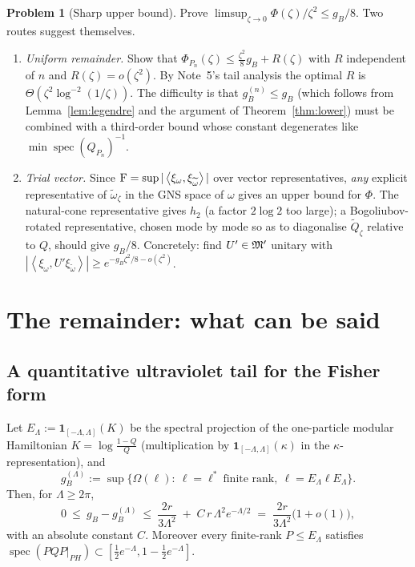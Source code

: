 \documentclass[11pt]{article}
\newcommand{\ip}[2]{\left\langle #1,#2\right\rangle}
\newcommand{\one}{\mathbf 1}
\newcommand{\Qt}{\widetilde Q}
\theoremstyle{definition}\newtheorem{problem}[theorem]{Problem}
\begin{document}
\begin{problem}[Sharp upper bound]\label{prob:sharp}
Prove \(\limsup_{\zeta\to0}\Phi(\zeta)/\zeta^2\le g_B/8\).  Two routes suggest themselves.
\begin{enumerate}[label=(\alph*),leftmargin=2em]
\item \emph{Uniform remainder.}  Show that
\(\Phi_{P_n}(\zeta)\le\frac{\zeta^2}8g_B+R(\zeta)\) with \(R\) independent of \(n\) and
\(R(\zeta)=o(\zeta^2)\).  By Note~5's tail analysis the optimal \(R\) is
\(\Theta(\zeta^2\log^{-2}(1/\zeta))\).  The difficulty is that \(g_B^{(n)}\le g_B\) (which follows
from Lemma~\ref{lem:legendre} and the argument of Theorem~\ref{thm:lower}) must be combined with a
third-order bound whose constant degenerates like \(\min\operatorname{spec}(Q_{P_n})^{-1}\).
\item \emph{Trial vector.}  Since \(\Fid=\sup|\ip{\xi_\omega}{\xi_{\widetilde\omega}}|\) over vector
representatives, \emph{any} explicit representative of \(\widetilde\omega_\zeta\) in the GNS space of
\(\omega\) gives an upper bound for \(\Phi\).  The natural-cone representative gives \(h_2\)
(a factor \(2\log2\) too large); a Bogoliubov-rotated representative, chosen mode by mode so as to
diagonalise \(\Qt_\zeta\) relative to \(Q\), should give \(g_B/8\).  Concretely: find
\(U'\in\mathfrak M'\) unitary with \(|\ip{\xi_\omega}{U'\xi_{\widetilde\omega}}|\ge e^{-g_B\zeta^2/8-o(\zeta^2)}\).
\end{enumerate}
\end{problem}

\section{The remainder: what can be said}\label{sec:remainder}

\subsection{A quantitative ultraviolet tail for the Fisher form}

\begin{proposition}\label{prop:tailgB}
Let \(E_\Lambda:=\one_{[-\Lambda,\Lambda]}(K)\) be the spectral projection of the one-particle modular
Hamiltonian \(K=\log\frac{1-Q}Q\) (multiplication by \(\one_{[-\Lambda,\Lambda]}(\kappa)\) in the
\(\kappa\)-representation), and
\[
 g_B^{(\Lambda)}:=\sup\bigl\{\Omega(\ell):\ \ell=\ell^*\ \text{finite rank},\ \ell=E_\Lambda\ell E_\Lambda\bigr\}.
\]
Then, for \(\Lambda\ge2\pi\),
\begin{equation}\label{eq:tailgB}
 0\ \le\ g_B-g_B^{(\Lambda)}\ \le\ \frac{2r}{3\Lambda^2}\;+\;C\,r\,\Lambda^{2}e^{-\Lambda/2}
 \;=\;\frac{2r}{3\Lambda^2}\bigl(1+o(1)\bigr),
\end{equation}
with an absolute constant \(C\).  Moreover every finite-rank \(P\le E_\Lambda\) satisfies
\(\operatorname{spec}(P Q P|_{PH})\subset[\tfrac12e^{-\Lambda},1-\tfrac12e^{-\Lambda}]\).
\end{proposition}
\end{document}
